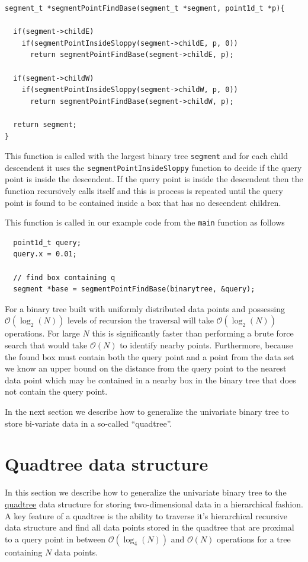 \begin{verbatim}
segment_t *segmentPointFindBase(segment_t *segment, point1d_t *p){

  if(segment->childE)
    if(segmentPointInsideSloppy(segment->childE, p, 0))
      return segmentPointFindBase(segment->childE, p);

  if(segment->childW)
    if(segmentPointInsideSloppy(segment->childW, p, 0))
      return segmentPointFindBase(segment->childW, p);

  return segment;
}
\end{verbatim}

This function is called with the largest binary tree \texttt{segment} and for each child descendent it uses the \texttt{segmentPointInsideSloppy} function to decide if the query point is inside the descendent. If the query point is inside the descendent then the function recursively calls itself and this is process is repeated until the query point is found to be contained inside a box that has no descendent children. 

This function is called in our example code from the \texttt{main} function as follows

\begin{verbatim}
  point1d_t query;
  query.x = 0.01;

  // find box containing q    
  segment *base = segmentPointFindBase(binarytree, &query);
\end{verbatim}
For a binary tree built with uniformly distributed data points and possessing $\mathcal{O}(\log_2(N))$ levels of recursion the traversal will take $\mathcal{O}(\log_2(N))$ operations. For large $N$ this is significantly faster than performing a brute force search that would take $\mathcal{O}(N)$ to identify nearby points. Furthermore, because the found box must contain both the query point and a point from the data set we know an upper bound on the distance from the query point to the nearest data point which may be contained in a nearby box in the binary tree that does not contain the query point. 

In the next section we describe how to generalize the univariate binary tree to store bi-variate data in a so-called ``quadtree''.


\newpage
\section{Quadtree data structure}

In this section we describe how to generalize the univariate binary tree to the \href{https://en.wikipedia.org/wiki/Quadtree}{quadtree} data structure \cite{finkel1974quad} for storing two-dimensional data in a hierarchical fashion. A key feature of a quadtree is the ability to traverse it's hierarchical recursive data structure and find all data points stored in the quadtree that are proximal to a query point in between $\mathcal{O}(\log_4(N))$ and $\mathcal{O}(N)$ operations for a tree containing $N$ data points. 

